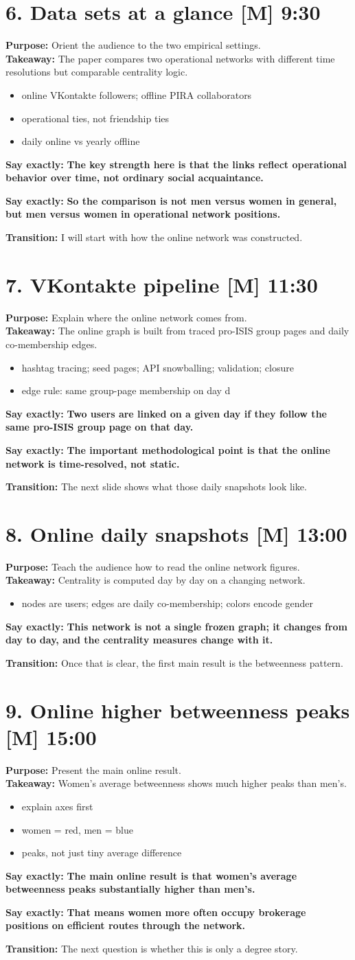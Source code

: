 \documentclass[11pt,a4paper]{article}
\newcommand{\slide}[4]{%
\section*{#1 \hfill {\normalsize #2}}
\textbf{Purpose:} #3\\
\textbf{Takeaway:} #4
}
\newcommand{\boldline}[1]{\par\textbf{Say exactly:} \textbf{#1}}
\newcommand{\transition}[1]{\par\textbf{Transition:} #1}
\newcommand{\labelbox}[1]{\textbf{[#1]}}
\begin{document}
\slide{6. Data sets at a glance \labelbox{M}}{9:30}{Orient the audience to the two empirical settings.}{The paper compares two operational networks with different time resolutions but comparable centrality logic.}
\begin{itemize}
\item online VKontakte followers; offline PIRA collaborators
\item operational ties, not friendship ties
\item daily online vs yearly offline
\end{itemize}
\boldline{The key strength here is that the links reflect operational behavior over time, not ordinary social acquaintance.}
\boldline{So the comparison is not men versus women in general, but men versus women in operational network positions.}
\transition{I will start with how the online network was constructed.}

\slide{7. VKontakte pipeline \labelbox{M}}{11:30}{Explain where the online network comes from.}{The online graph is built from traced pro-ISIS group pages and daily co-membership edges.}
\begin{itemize}
\item hashtag tracing; seed pages; API snowballing; validation; closure
\item edge rule: same group-page membership on day d
\end{itemize}
\boldline{Two users are linked on a given day if they follow the same pro-ISIS group page on that day.}
\boldline{The important methodological point is that the online network is time-resolved, not static.}
\transition{The next slide shows what those daily snapshots look like.}

\slide{8. Online daily snapshots \labelbox{M}}{13:00}{Teach the audience how to read the online network figures.}{Centrality is computed day by day on a changing network.}
\begin{itemize}
\item nodes are users; edges are daily co-membership; colors encode gender
\end{itemize}
\boldline{This network is not a single frozen graph; it changes from day to day, and the centrality measures change with it.}
\transition{Once that is clear, the first main result is the betweenness pattern.}

\slide{9. Online higher betweenness peaks \labelbox{M}}{15:00}{Present the main online result.}{Women’s average betweenness shows much higher peaks than men’s.}
\begin{itemize}
\item explain axes first
\item women = red, men = blue
\item peaks, not just tiny average difference
\end{itemize}
\boldline{The main online result is that women’s average betweenness peaks substantially higher than men’s.}
\boldline{That means women more often occupy brokerage positions on efficient routes through the network.}
\transition{The next question is whether this is only a degree story.}
\end{document}
